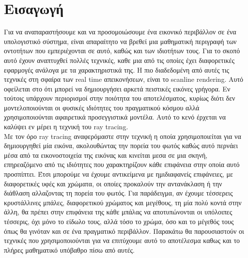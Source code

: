 \chapter{Εισαγωγή}
\ifpdf
    \graphicspath{{Introduction/IntroductionFigs/PNG/}{Introduction/IntroductionFigs/PDF/}{Introduction/IntroductionFigs/}}
\else
    \graphicspath{{Introduction/IntroductionFigs/EPS/}{Introduction/IntroductionFigs/}}
\fi

Για να αναπαραστήσουμε και να προσομοιώσουμε ένα εικονικό περιβάλλον σε ένα υπολογιστικό σύστημα,
είναι απαραίτητο να βρεθεί μια μαθηματική περιγραφή των οντοτήτων που εμπεριέχονται σε αυτό, 
καθώς και των ιδιοτήτων τους. Για το σκοπό αυτό έχουν αναπτυχθεί πολλές τεχνικές,
καθε μια από τις οποίες έχει διαφορετικές εφαρμογές ανάλογα με τα χαρακτηριστικά της. Η πιο
διαδεδομένη από αυτές τις τεχνικές στη σφαίρα των real time απεικονήσεων, είναι το scanline 
rendering. Αυτό οφείλεται στο ότι μπορεί να δημιουργήσει αρκετά πειστικές εικόνες γρήγορα. 
Εν τούτοις υπάρχουν περιορισμοί στην ποιότητα του αποτελέσματος, κυρίως διότι δεν μοντελοποιούνται 
οι φυσικές ιδιότητες του πραγματικού κόσμου αλλά χρησιμοποιούνται αφαιρετικά προσεγγιστικά μοντέλα. 
Αυτό το κενό έρχεται να καλύψει εν μέρει η τεχνική του ray tracing.\\

Με τον όρο ray tracing αναφερόμαστε στην τεχνική η οποία χρησιμοποιείται για να δημιουργηθεί μία 
εικόνα, ακολουθώντας την πορεία του φωτός καθώς αυτό περνάει μέσα από τα εικονοστοιχεία της εικόνας 
και κινείται μεσα σε μια σκηνή, επηρεαζόμενο από τις ιδιότητες που χαρακτηρίζουν κάθε επιφάνεια στην
οποία αυτό προσπίπτει. Έτσι μπορούμε να έχουμε αντικείμενα με ημιδιαφανείς επιφάνειες, με διαφορετικές 
υφές και χρώματα, οι οποίες προκαλούν την αντανάκλαση ή την διάθλαση αλλαζοντας τη πορεία του φωτός.
Για παράδειγμα, αν έχουμε τέσσερεις κρυστάλλινες μπάλες, διαφορετικού χρώματος και μεγέθους, τη μία 
πολύ κοντά στην άλλη, θα πρέπει στην επιφάνεια της κάθε μπάλας να αποτυπώνονται οι υπόλοιπες τέσσερις, 
όχι μόνο το είδωλο τους, αλλά τόσο το χρώμα, όσο και το μέγεθός τους όπως θα γινόταν και σε ένα 
πραγματικό περιβάλλον. Παρακάτω θα παρουσιαστούν οι τεχνικές που χρησιμοποιούνται για να επιτύχουμε
αυτό το αποτέλεσμα καθως και το πλήρες μαθηματικό υπόβαθρο πίσω από αυτές.


